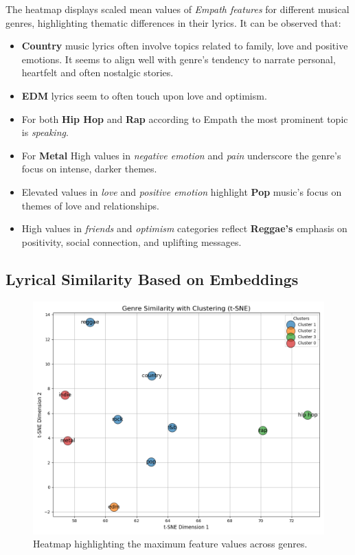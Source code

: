 The heatmap displays scaled mean values of \textit{Empath features} for
different musical genres, highlighting thematic  differences in their lyrics.
It can be observed that:
\begin{itemize}
  \item \textbf{Country} music lyrics often involve topics related to family,
    love and  positive emotions. It seems to align well with genre's tendency
    to narrate personal, heartfelt and often nostalgic stories.
  \item \textbf{EDM} lyrics seem to often touch upon love and optimism.
  \item For both \textbf{Hip Hop} and \textbf{Rap} according to Empath  the
    most prominent topic is \textit{speaking}.
  \item For \textbf{Metal} High values in \textit{negative emotion }and
    \textit{pain} underscore the genre's focus on intense, darker themes.
  \item Elevated values in \textit{love} and \textit{positive emotion}
    highlight \textbf{Pop} music’s focus on themes of love and relationships.
  \item High values in \textit{friends } and \textit{optimism} categories
    reflect \textbf{Reggae's} emphasis on positivity, social connection, and
    uplifting messages.
\end{itemize}

\subsection{Lyrical Similarity Based on Embeddings}
\begin{center}
\begin{figure}[H]
  \centering
  \includegraphics[width=6in]{img/tsne_genres.png}
  \caption{Heatmap highlighting the maximum feature values across genres.}
  \label{Figure:dendrogram_spotify_features}
\end{figure}
\end{center}

